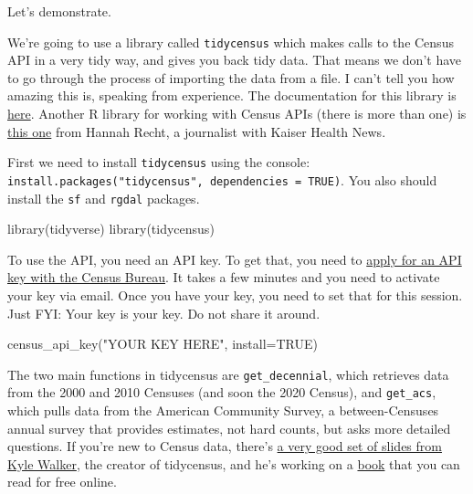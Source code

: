 \documentclass[
  letterpaper,
  DIV=11,
  numbers=noendperiod]{scrreprt}
\newenvironment{Shaded}{\begin{snugshade}}{\end{snugshade}}
\newcommand{\AttributeTok}[1]{\textcolor[rgb]{0.40,0.45,0.13}{#1}}
\newcommand{\ConstantTok}[1]{\textcolor[rgb]{0.56,0.35,0.01}{#1}}
\newcommand{\FunctionTok}[1]{\textcolor[rgb]{0.28,0.35,0.67}{#1}}
\newcommand{\NormalTok}[1]{\textcolor[rgb]{0.00,0.23,0.31}{#1}}
\newcommand{\StringTok}[1]{\textcolor[rgb]{0.13,0.47,0.30}{#1}}
\begin{document}
Let's demonstrate.

We're going to use a library called \texttt{tidycensus} which makes
calls to the Census API in a very tidy way, and gives you back tidy
data. That means we don't have to go through the process of importing
the data from a file. I can't tell you how amazing this is, speaking
from experience. The documentation for this library is
\href{https://walker-data.com/tidycensus/}{here}. Another R library for
working with Census APIs (there is more than one) is
\href{https://github.com/hrecht/censusapi}{this one} from Hannah Recht,
a journalist with Kaiser Health News.

First we need to install \texttt{tidycensus} using the console:
\texttt{install.packages("tidycensus",\ dependencies\ =\ TRUE)}. You
also should install the \texttt{sf} and \texttt{rgdal} packages.

\begin{Shaded}
\begin{Highlighting}[]
\FunctionTok{library}\NormalTok{(tidyverse)}
\FunctionTok{library}\NormalTok{(tidycensus)}
\end{Highlighting}
\end{Shaded}

To use the API, you need an API key. To get that, you need to
\href{https://api.census.gov/data/key_signup.html}{apply for an API key
with the Census Bureau}. It takes a few minutes and you need to activate
your key via email. Once you have your key, you need to set that for
this session. Just FYI: Your key is your key. Do not share it around.

\begin{Shaded}
\begin{Highlighting}[]
\FunctionTok{census\_api\_key}\NormalTok{(}\StringTok{"YOUR KEY HERE"}\NormalTok{, }\AttributeTok{install=}\ConstantTok{TRUE}\NormalTok{)}
\end{Highlighting}
\end{Shaded}

The two main functions in tidycensus are \texttt{get\_decennial}, which
retrieves data from the 2000 and 2010 Censuses (and soon the 2020
Census), and \texttt{get\_acs}, which pulls data from the American
Community Survey, a between-Censuses annual survey that provides
estimates, not hard counts, but asks more detailed questions. If you're
new to Census data, there's
\href{http://walker-data.com/umich-workshop/census-data-in-r/slides/\#1}{a
very good set of slides from Kyle Walker}, the creator of tidycensus,
and he's working on a
\href{https://walker-data.com/census-r/index.html}{book} that you can
read for free online.
\end{document}
